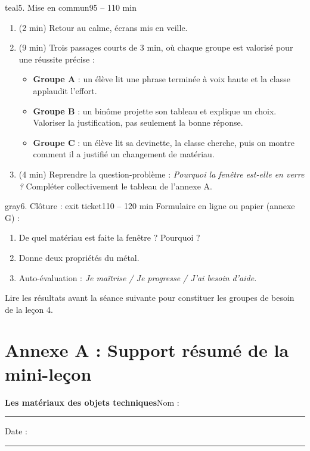 \documentclass[11pt,a4paper]{article}
\newcommand{\entete}[2]{%
  \begin{tcolorbox}[colback=#1!10,colframe=#1!70!black,boxrule=0.8pt,arc=2mm]
  {\Large\bfseries #2}\hfill Nom : \rule{4cm}{0.3pt}\quad Date : \rule{2.2cm}{0.3pt}
  \end{tcolorbox}}
\begin{document}
\begin{etape}{teal}{5. Mise en commun}{95 -- 110 min}
\begin{enumerate}
 \item (2 min) Retour au calme, écrans mis en veille.
 \item (9 min) Trois passages courts de 3 min, où chaque groupe est valorisé pour une réussite précise :
 \begin{itemize}
  \item \textbf{Groupe A} : un élève lit une phrase terminée à voix haute et la classe applaudit l'effort.
  \item \textbf{Groupe B} : un binôme projette son tableau et explique un choix. Valoriser la justification, pas seulement la bonne réponse.
  \item \textbf{Groupe C} : un élève lit sa devinette, la classe cherche, puis on montre comment il a justifié un changement de matériau.
 \end{itemize}
 \item (4 min) Reprendre la question-problème : \textit{Pourquoi la fenêtre est-elle en verre ?} Compléter collectivement le tableau de l'annexe A.
\end{enumerate}
\end{etape}

\begin{etape}{gray}{6. Clôture : exit ticket}{110 -- 120 min}
Formulaire en ligne ou papier (annexe G) :
\begin{enumerate}
 \item De quel matériau est faite la fenêtre ? Pourquoi ?
 \item Donne deux propriétés du métal.
 \item Auto-évaluation : \emph{Je maîtrise / Je progresse / J'ai besoin d'aide.}
\end{enumerate}
Lire les résultats avant la séance suivante pour constituer les groupes de besoin de la leçon 4.
\end{etape}

\newpage
\section*{Annexe A : Support résumé de la mini-leçon}
\entete{blue}{Les matériaux des objets techniques}
\end{document}
